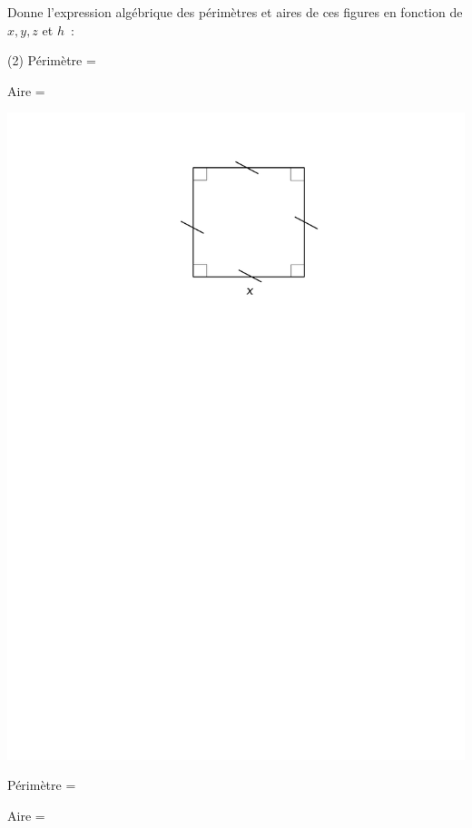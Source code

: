 \documentclass[a4paper,11pt]{report}
\begin{document}
\begin{exop}{ Donne l'expression algébrique des périmètres et aires de ces figures en fonction de $x, y, z$ et $h$~:

\begin{tasks}(2)
	\task[] 
Périmètre = \hrulefill

    Aire = \hrulefill

\begin{center}
	\includegraphics[scale=0.7]{media/fa-10/carre.pdf}
\end{center}

    \task[]
Périmètre = \hrulefill

 Aire = \hrulefill
 

\end{tasks}}
\end{exop}
\end{document}
